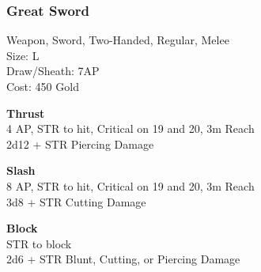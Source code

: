 \subsubsection{Great Sword}\label{weapon:greatSword}
Weapon, Sword, Two-Handed, Regular, Melee\\
Size: L\\
Draw/Sheath: 7AP\\
Cost: 450 Gold

\textbf{Thrust}\\
4 AP, STR to hit, Critical on 19 and 20, 3m Reach\\
2d12 + \texttimes STR Piercing Damage

\textbf{Slash}\\
8 AP, STR to hit, Critical on 19 and 20, 3m Reach\\
3d8 + \texttimes STR Cutting Damage

\textbf{Block}\\
STR to block\\
2d6 + \texttimes STR Blunt, Cutting, or Piercing Damage